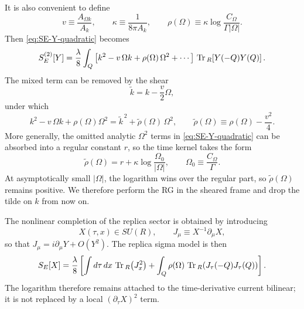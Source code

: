 \documentclass[aps,prx,preprint,amsmath,amssymb]{revtex4-2}
\newcommand{\Tr}{{\rm \, Tr\,}}
\begin{document}
It is also convenient to define
\begin{equation}\label{eq:v-rho-def}
v\equiv \frac{A_{\Omega k}}{A_k},
\qquad
\kappa\equiv \frac{1}{8\pi A_k},
\qquad
\rho(\Omega)\equiv \kappa\log\!\frac{C_\Omega}{\Gamma|\Omega|}.
\end{equation}
Then \eqref{eq:SE-Y-quadratic} becomes
\begin{equation}\label{eq:SE-Y-kernel}
S_E^{(2)}[Y]
=
\frac{\lambda}{8}\int_Q
\left[
k^2-v\,\Omega k+\rho(\Omega)\,\Omega^2+\cdots
\right]
\Tr_R\!\left[Y(-Q)Y(Q)\right].
\end{equation}
The mixed term can be removed by the shear
\begin{equation}
\tilde k = k-\frac{v}{2}\Omega,
\end{equation}
under which
\begin{equation}\label{eq:kernel-sheared}
k^2-v\,\Omega k+\rho(\Omega)\Omega^2
=
\tilde k^{\,2}
+\tilde\rho(\Omega)\,\Omega^2,
\qquad
\tilde\rho(\Omega)\equiv \rho(\Omega)-\frac{v^2}{4}.
\end{equation}
More generally, the omitted analytic \(\Omega^2\) terms in
\eqref{eq:SE-Y-quadratic} can be absorbed into a regular constant \(r\), so the
time kernel takes the form
\begin{equation}\label{eq:rho-decomp}
\tilde\rho(\Omega)=r+\kappa\log\!\frac{\Omega_0}{|\Omega|},
\qquad
\Omega_0\equiv \frac{C_\Omega}{\Gamma}.
\end{equation}
At asymptotically small \(|\Omega|\), the logarithm wins over the regular part,
so \(\tilde\rho(\Omega)\) remains positive.  We therefore perform the RG in the
sheared frame and drop the tilde on \(k\) from now on.

The nonlinear completion of the replica sector is obtained by introducing
\begin{equation}\label{eq:X-field-def}
X(\tau,x)\in SU(R),
\qquad
J_\mu\equiv X^{-1}\partial_\mu X,
\end{equation}
so that \(J_\mu=i\partial_\mu Y+O(Y^2)\).  The replica sigma model is then
\begin{equation}\label{eq:SE-X}
S_E[X]
=
\frac{\lambda}{8}
\left[
\int d\tau\,dx\,\Tr_R\!\left(J_x^2\right)
+\int_Q \rho(\Omega)\,
\Tr_R\!\left(J_\tau(-Q)J_\tau(Q)\right)
\right].
\end{equation}
The logarithm therefore remains attached to the time-derivative current
bilinear; it is not replaced by a local \((\partial_\tau X)^2\) term.
\end{document}
